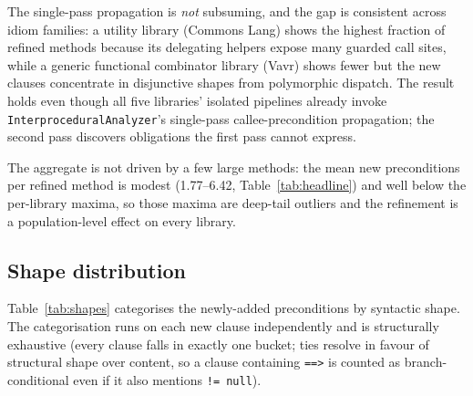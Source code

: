 The single-pass propagation is \emph{not} subsuming, and
the gap is consistent across idiom families: a utility library
(Commons Lang) shows the highest fraction of refined methods because
its delegating helpers expose many guarded call sites, while a
generic functional combinator library (Vavr) shows fewer but the
new clauses concentrate in disjunctive shapes from polymorphic
dispatch. The result holds even though all five libraries' isolated
pipelines already invoke
\texttt{InterproceduralAnalyzer}'s single-pass callee-precondition
propagation; the second pass discovers obligations the first pass
cannot express.

The aggregate is not driven by a few large methods: the mean new
preconditions per refined method is modest (1.77--6.42, Table~\ref{tab:headline})
and well below the per-library maxima, so those maxima are deep-tail
outliers and the refinement is a population-level effect on every
library.

\subsection{Shape distribution}

Table~\ref{tab:shapes} categorises the newly-added preconditions by
syntactic shape. The categorisation runs on each new clause
independently and is structurally exhaustive (every clause falls in
exactly one bucket; ties resolve in favour of structural shape
over content, so a clause containing \texttt{==>} is counted as
branch-conditional even if it also mentions \texttt{!= null}).

